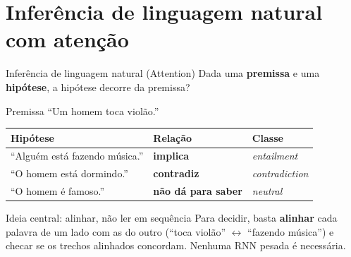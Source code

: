 
\section{Inferência de linguagem natural com atenção}

\begin{frame}{Inferência de linguagem natural (Attention)}
    \small
    Dada uma \textbf{premissa} e uma \textbf{hipótese}, a hipótese decorre da premissa?
    \vspace{0.15cm}
    \begin{block}{Premissa}
        \centering ``Um homem toca violão.''
    \end{block}
    \vspace{0.1cm}
    {\centering
    \footnotesize
    \begin{tabular}{@{}lll@{}}
        \toprule
        Hipótese & Relação & Classe \\
        \midrule
        ``Alguém está fazendo música.''  & {\color{dexpiGreenDark}\textbf{implica}}     & \textit{entailment} \\
        ``O homem está dormindo.''       & {\color{dexpiRedDark}\textbf{contradiz}}     & \textit{contradiction} \\
        ``O homem é famoso.''            & {\color{dexpiBlue}\textbf{não dá para saber}} & \textit{neutral} \\
        \bottomrule
    \end{tabular}\par}

    \vspace{0.2cm}
    \begin{exampleblock}{Ideia central: alinhar, não ler em sequência}
        \footnotesize
        Para decidir, basta \textbf{alinhar} cada palavra de um lado com as do outro (``toca violão'' $\leftrightarrow$ ``fazendo música'') e checar se os trechos alinhados concordam. Nenhuma RNN pesada é necessária.
    \end{exampleblock}


\end{frame}

